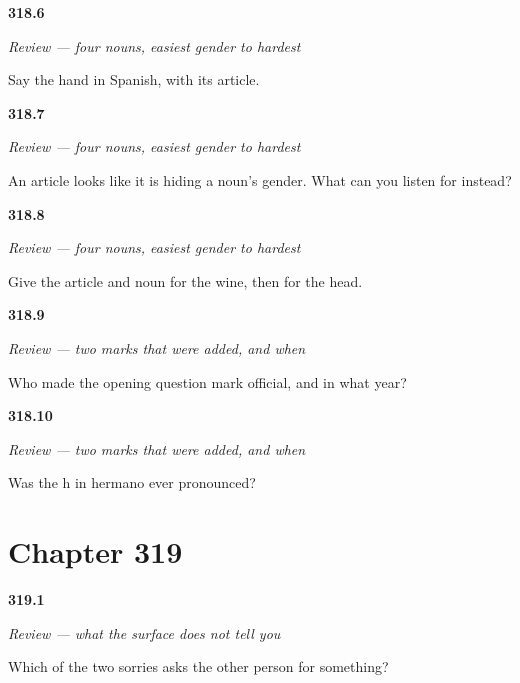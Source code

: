 \noindent\begin{minipage}[t]{\linewidth}
\raggedright
\hypertarget{review-ES-C318-repaso-genero-hand}{\textbf{318.6}} \emph{Review — four nouns, easiest gender to hardest}\par
\small Say the hand in Spanish, with its article.
\end{minipage}\par\medskip

\noindent\begin{minipage}[t]{\linewidth}
\raggedright
\hypertarget{review-ES-C318-repaso-genero-witness}{\textbf{318.7}} \emph{Review — four nouns, easiest gender to hardest}\par
\small An article looks like it is hiding a noun's gender. What can you listen for instead?
\end{minipage}\par\medskip

\noindent\begin{minipage}[t]{\linewidth}
\raggedright
\hypertarget{review-ES-C318-repaso-genero-wine}{\textbf{318.8}} \emph{Review — four nouns, easiest gender to hardest}\par
\small Give the article and noun for the wine, then for the head.
\end{minipage}\par\medskip

\noindent\begin{minipage}[t]{\linewidth}
\raggedright
\hypertarget{review-ES-C318-repaso-marcas-year}{\textbf{318.9}} \emph{Review — two marks that were added, and when}\par
\small Who made the opening question mark official, and in what year?
\end{minipage}\par\medskip

\noindent\begin{minipage}[t]{\linewidth}
\raggedright
\hypertarget{review-ES-C318-repaso-marcas-h}{\textbf{318.10}} \emph{Review — two marks that were added, and when}\par
\small Was the h in hermano ever pronounced?
\end{minipage}\par\medskip

\section*{Chapter 319}

\noindent\begin{minipage}[t]{\linewidth}
\raggedright
\hypertarget{review-ES-C319-repaso-la-superficie-sorry}{\textbf{319.1}} \emph{Review — what the surface does not tell you}\par
\small Which of the two sorries asks the other person for something?
\end{minipage}\par\medskip

